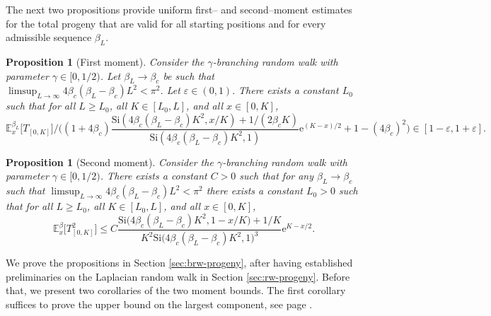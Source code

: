 \documentclass[a4paper, a4wide, 10pt, reqno]{amsart}
\theoremstyle{plain}
\newtheorem{proposition}[theorem]{Proposition}
\theoremstyle{definition}
\numberwithin{equation}{section}
\newcommand{\E}{\mathbb E}
\newcommand{\re}{{\mathrm e}}
\newcommand{\Si}{{\mathrm{Si}}}
\begin{document}
The next two propositions provide  uniform first– and second–moment estimates for the total progeny that are valid for all starting positions and for every admissible sequence $\beta_L$. 
\begin{proposition}[First moment]\label{prop:first-moment-asymp}
Consider the $\gamma$-branching random walk with parameter $\gamma\in[0,1/2)$.
Let $\beta_L\to\beta_c$ be such that $\limsup_{L\to\infty}4\beta_c(\beta_L-\beta_c) L^2<\pi^2$. Let $\varepsilon\in(0,1).$ There exists a constant $L_0$ such that for all $L\ge L_0$, all $K\in[L_0,L]$, and all $x\in[0,K]$, 
    \[
    \E_x^{\beta_L}\big[T_{[0, K]}\big]\bigg/\bigg((1+4\beta_c)\frac{\Si(4\beta_c(\beta_L-\beta_c) K^2, x/K)+1/(2\beta_cK)}{\Si(4\beta_c(\beta_L-\beta_c) K^2,1)}\re^{(K-x)/2} +1-(4\beta_c)^2\bigg) \in[1-\varepsilon, 1+\varepsilon].
    \]
\end{proposition}

\begin{proposition}[Second moment]\label{prop:second-moment-upper}
    Consider the $\gamma$-branching random walk with parameter $\gamma\in[0,1/2)$. There exists a constant $C>0$ such that for any  $\beta_L\to\beta_c$  such that $\limsup_{L\to\infty}4\beta_c(\beta_L-\beta_c) L^2<\pi^2$ there exists a constant $L_0>0$ such that for all $L\ge L_0$, all $K\in[L_0,L]$, and all $x\in[0,K]$, 
\begin{equation}\label{eq:second-moment-upper}
    \E_x^{\beta}\big[T_{[0, K]}^2\big]\le  C\frac{\Si\big(4\beta_c(\beta_L-\beta_c) K^2, 1-x/ K\big) + 1/ K}{ K^2\Si\big(4\beta_c(\beta_L-\beta_c) K^2, 1\big)^3}\re^{ K-x/2}.
    \end{equation}
\end{proposition}
We prove the propositions in Section \ref{sec:brw-progeny}, after having established preliminaries on the Laplacian random walk in Section \ref{sec:rw-progeny}. Before that, we present two corollaries of the two moment bounds. The first corollary suffices to prove the upper bound on the largest component, see page \pageref{pr:largest-upper}.
\end{document}

